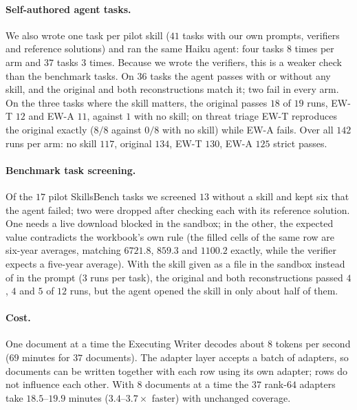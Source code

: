 \documentclass[11pt]{article}
\newcommand{\EWT}{\textsc{EW-T}}
\newcommand{\EWA}{\textsc{EW-A}}
\begin{document}
\paragraph{Self-authored agent tasks.} We also wrote one task per pilot skill ($41$ tasks with our own prompts, verifiers and reference solutions) and
ran the same Haiku agent: four tasks $8$ times per arm and $37$ tasks $3$ times. Because we wrote the verifiers, this is a weaker check than the benchmark
tasks. On $36$ tasks the agent passes with or without any skill, and the original and both reconstructions match it; two fail in every arm. On the three
tasks where the skill matters, the original passes $18$ of $19$ runs, \EWT{} $12$ and \EWA{} $11$, against $1$ with no skill; on threat triage \EWT{}
reproduces the original exactly ($8/8$ against $0/8$ with no skill) while \EWA{} fails. Over all $142$ runs per arm: no skill $117$, original $134$, \EWT{}
$130$, \EWA{} $125$ strict passes.

\paragraph{Benchmark task screening.} Of the $17$ pilot SkillsBench tasks we screened $13$ without a skill and kept six that the agent failed; two were
dropped after checking each with its reference solution. One needs a live download blocked in the sandbox; in the other, the expected value contradicts
the workbook's own rule (the filled cells of the same row are six-year averages, matching $6721.8$, $859.3$ and $1100.2$ exactly, while the verifier
expects a five-year average). With the skill given as a file in the sandbox instead of in the prompt ($3$ runs per task), the original and both
reconstructions passed $4$, $4$ and $5$ of $12$ runs, but the agent opened the skill in only about half of them.

\paragraph{Cost.} One document at a time the Executing Writer decodes about $8$ tokens per second ($69$ minutes for $37$ documents). The adapter layer
accepts a batch of adapters, so documents can be written together with each row using its own adapter; rows do not influence each other. With $8$
documents at a time the $37$ rank-$64$ adapters take $18.5$--$19.9$ minutes ($3.4$--$3.7\times$ faster) with unchanged coverage.

\end{document}
